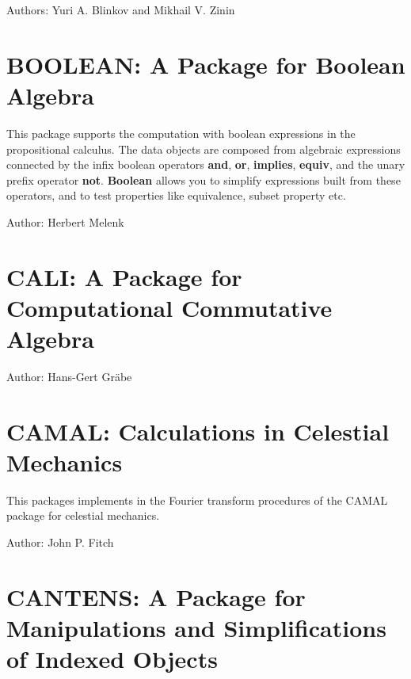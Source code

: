 Authors: Yuri A. Blinkov and Mikhail V. Zinin



\newpage

\section{BOOLEAN: A Package for Boolean Algebra}

This package supports the computation with boolean expressions in the
propositional calculus.  The data objects are composed from algebraic
expressions connected by the infix boolean operators \textbf{and}, \textbf{or},
\textbf{implies}, \textbf{equiv}, and the unary prefix operator \textbf{not}.
\textbf{Boolean} allows you to simplify expressions built from these
operators, and to test properties like equivalence, subset property etc.

Author: Herbert Melenk



\newpage

\section{CALI: A Package for Computational Commutative Algebra}

Author: Hans-Gert Gr\"abe



\newpage

\section{CAMAL: Calculations in Celestial Mechanics}
\label{CAMAL}

This packages implements in \REDUCE the Fourier transform procedures of the
CAMAL package for celestial mechanics.

Author: John P. Fitch



\newpage

\section{CANTENS: A Package for Manipulations
and Simplifications of Indexed Objects}

